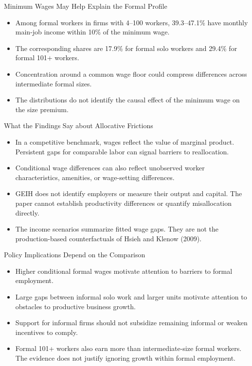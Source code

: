 \begin{frame}{Minimum Wages May Help Explain the Formal Profile}
  \begin{itemize}
    \item Among formal workers in firms with 4--100 workers, 39.3--47.1\% have monthly main-job income within 10\% of the minimum wage.
    \item The corresponding shares are 17.9\% for formal solo workers and 29.4\% for formal 101+ workers.
    \item Concentration around a common wage floor could compress differences across intermediate formal sizes.
    \item The distributions do not identify the causal effect of the minimum wage on the size premium.
  \end{itemize}
\end{frame}

\begin{frame}{What the Findings Say about Allocative Frictions}
  \begin{itemize}
    \item In a competitive benchmark, wages reflect the value of marginal product. Persistent gaps for comparable labor can signal barriers to reallocation.
    \item Conditional wage differences can also reflect unobserved worker characteristics, amenities, or wage-setting differences.
    \item GEIH does not identify employers or measure their output and capital. The paper cannot establish productivity differences or quantify misallocation directly.
    \item The income scenarios summarize fitted wage gaps. They are not the production-based counterfactuals of Hsieh and Klenow (2009).
  \end{itemize}
\end{frame}

\begin{frame}{Policy Implications Depend on the Comparison}
  \begin{itemize}
    \item Higher conditional formal wages motivate attention to barriers to formal employment.
    \item Large gaps between informal solo work and larger units motivate attention to obstacles to productive business growth.
    \item Support for informal firms should not subsidize remaining informal or weaken incentives to comply.
    \item Formal 101+ workers also earn more than intermediate-size formal workers. The evidence does not justify ignoring growth within formal employment.
  \end{itemize}
\end{frame}

